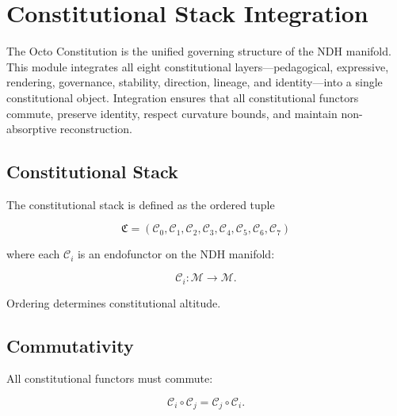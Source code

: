 
\section{Constitutional Stack Integration}
\label{sec:constitutional-integration}

The Octo Constitution is the unified governing structure of the NDH manifold.
This module integrates all eight constitutional layers—pedagogical, expressive,
rendering, governance, stability, direction, lineage, and identity—into a
single constitutional object. Integration ensures that all constitutional
functors commute, preserve identity, respect curvature bounds, and maintain
non-absorptive reconstruction.


\subsection{Constitutional Stack}

The constitutional stack is defined as the ordered tuple

\[
\mathfrak{C} =
(\mathcal{C}_0, \mathcal{C}_1, \mathcal{C}_2,
 \mathcal{C}_3, \mathcal{C}_4,
 \mathcal{C}_5, \mathcal{C}_6, \mathcal{C}_7)
\]

where each $\mathcal{C}_i$ is an endofunctor on the NDH manifold:

\[
\mathcal{C}_i : \mathcal{M} \to \mathcal{M}.
\]

Ordering determines constitutional altitude.


\subsection{Commutativity}

All constitutional functors must commute:

\[
\mathcal{C}_i \circ \mathcal{C}_j
=
\mathcal{C}_j \circ \mathcal{C}_i.
\]

